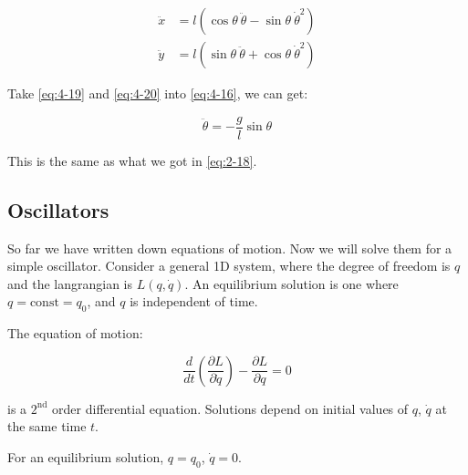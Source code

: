 \begin{align}
    \label{eq:4-19}
    \ddot{x} &= l\left(\cos \theta \ \ddot{\theta} - \sin \theta \ \dot{\theta}^2\right) \\
    \label{eq:4-20}
    \ddot{y} &= l\left(\sin \theta \ \ddot{\theta} + \cos \theta \ \dot{\theta}^2\right)
\end{align}

Take \ref{eq:4-19} and \ref{eq:4-20} into \ref{eq:4-16}, we can get:

\begin{equation}
    \ddot{\theta} = -\frac{g}{l} \sin \theta
\end{equation}

This is the same as what we got in \ref{eq:2-18}.

\subsection{Oscillators}

So far we have written down equations of motion. Now we will solve them for a simple oscillator. Consider a general 1D system, where the degree of freedom is $q$ and the langrangian is $L\left(q, \dot{q}\right)$. An equilibrium solution is one where $q = \text{const} = q_0$, and $q$ is independent of time.

The equation of motion:

\begin{equation}
    \frac{d}{dt} \left(\frac{\partial L}{\partial \dot{q}}\right) - \frac{\partial L}{\partial q} = 0
\end{equation}

is a $2^\text{nd}$ order differential equation. Solutions depend on initial values of $q$, $\dot{q}$ at the same time $t$.

For an equilibrium solution, $q = q_0$, $\dot{q} = 0$.
